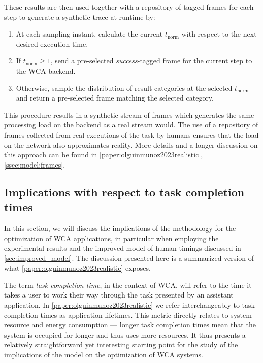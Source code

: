 These results are then used together with a repository of tagged frames for each step to generate a synthetic trace at runtime by:
\begin{enumerate}
    \item At each sampling instant, calculate the current \ensuremath{t_\text{norm}} with respect to the next desired execution time.
    \item If \ensuremath{t_\text{norm} \geq 1}, send a pre-selected \emph{success}-tagged frame for the current step to the \gls{WCA} backend.
    \item Otherwise, sample the distribution of result categories at the selected \ensuremath{t_\text{norm}} and return a pre-selected frame matching the selected category.
\end{enumerate}

This procedure results in a synthetic stream of frames which generates the same processing load on the backend as a real stream would.
The use of a repository of frames collected from real executions of the task by humans ensures that the load on the network also approximates reality.
More details and a longer discussion on this approach can be found in \cref{paper:olguinmunoz2023realistic}, \cref{ssec:model:frames}.

\subsection{Implications with respect to task completion times}

In this section, we will discuss the implications of the methodology for the optimization of \gls{WCA} applications, in particular when employing the experimental results and the improved model of human timings discussed in \cref{sec:improved_model}.
The discussion presented here is a summarized version of what \cref{paper:olguinmunoz2023realistic} exposes.

The term \emph{task completion time}, in the context of \gls{WCA}, will refer to the time it takes a user to work their way through the task presented by an assistant application.
In \cref{paper:olguinmunoz2023realistic} we refer interchangeably to task completion times as application lifetimes.
This metric directly relates to system resource and energy consumption --- longer task completion times mean that the system is occupied for longer and thus uses more resources.
It thus presents a relatively straightforward yet interesting starting point for the study of the implications of the model on the optimization of \gls{WCA} systems.

